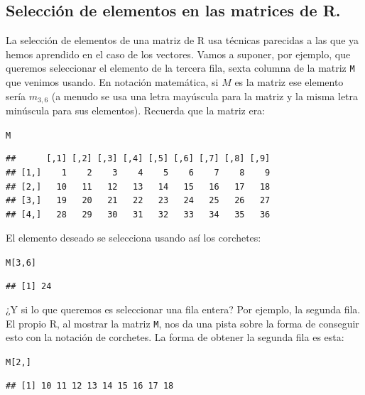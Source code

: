 \documentclass[10pt,a4paper]{article}\usepackage[]{graphicx}\usepackage[]{color}
\makeatletter
\newcommand{\hlnum}[1]{\textcolor[rgb]{0.686,0.059,0.569}{#1}}%
\newcommand{\hlstd}[1]{\textcolor[rgb]{0.345,0.345,0.345}{#1}}%
\newenvironment{kframe}{%
 \def\at@end@of@kframe{}%
 \ifinner\ifhmode%
  \def\at@end@of@kframe{\end{minipage}}%
  \begin{minipage}{\columnwidth}%
 \fi\fi%
 \def\FrameCommand##1{\hskip\@totalleftmargin \hskip-\fboxsep
 \colorbox{shadecolor}{##1}\hskip-\fboxsep
     \hskip-\linewidth \hskip-\@totalleftmargin \hskip\columnwidth}%
 \MakeFramed {\advance\hsize-\width
   \@totalleftmargin\z@ \linewidth\hsize
   \@setminipage}}%
 {\par\unskip\endMakeFramed%
 \at@end@of@kframe}
\newenvironment{knitrout}{}{} %
\makeatother
\begin{document}
\subsection{Selección de elementos en las matrices de R.}
\label{tut03:subsec:SeleccionElementosMatrices}


La selección de elementos de una matriz de R usa técnicas parecidas a las que ya hemos aprendido en el caso de los vectores. Vamos a suponer, por ejemplo, que queremos seleccionar el elemento de la tercera fila, sexta columna de la matriz {\tt M} que venimos usando. En notación matemática, si $M$ es la matriz ese elemento sería $m_{3,6}$ (a menudo se usa una letra mayúscula para la matriz y la misma letra minúscula para sus elementos). Recuerda que la matriz era:
\begin{knitrout}
\color{fgcolor}\begin{kframe}
\begin{alltt}
    \hlstd{M}
\end{alltt}
\begin{verbatim}
##      [,1] [,2] [,3] [,4] [,5] [,6] [,7] [,8] [,9]
## [1,]    1    2    3    4    5    6    7    8    9
## [2,]   10   11   12   13   14   15   16   17   18
## [3,]   19   20   21   22   23   24   25   26   27
## [4,]   28   29   30   31   32   33   34   35   36
\end{verbatim}
\end{kframe}
\end{knitrout}
El elemento deseado se selecciona usando así los corchetes:
\begin{knitrout}
\color{fgcolor}\begin{kframe}
\begin{alltt}
    \hlstd{M[}\hlnum{3}\hlstd{,} \hlnum{6}\hlstd{]}
\end{alltt}
\begin{verbatim}
## [1] 24
\end{verbatim}
\end{kframe}
\end{knitrout}
¿Y si lo que queremos es seleccionar una fila entera? Por ejemplo, la segunda fila. El propio R, al mostrar la matriz {\tt M}, nos da una pista sobre la forma de conseguir esto con la notación de corchetes. La forma de obtener la segunda fila es esta:
\begin{knitrout}
\color{fgcolor}\begin{kframe}
\begin{alltt}
    \hlstd{M[}\hlnum{2}\hlstd{, ]}
\end{alltt}
\begin{verbatim}
## [1] 10 11 12 13 14 15 16 17 18
\end{verbatim}
\end{kframe}
\end{knitrout}
\end{document}

